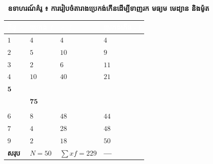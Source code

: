 \documentclass[theme=teal]{khmermath}
\renewcommand{\arraystretch}{1.14}
\begin{document}
\begin{khcard}
  {\fontsize{9.5}{9.5}\selectfont\kml\bfseries\color{brandNavy}\ ឧទាហរណ៍គំរូ ៖ ការរៀបចំតារាងប្រេកង់កើនដើម្បីទាញរក មធ្យម មេដ្យាន និងម៉ូត}\\[3.5pt]
  \noindent
  \begin{minipage}[t]{0.435\textwidth}
    \centering
    \renewcommand{\arraystretch}{1.72}
    {\fontsize{8.5}{8.5}\selectfont
    \begin{tabular}{|>{\centering\arraybackslash}m{1.1cm}|>{\centering\arraybackslash}m{1.42cm}|>{\centering\arraybackslash}m{1.45cm}|>{\centering\arraybackslash}m{1.85cm}|}
      \hline
      \rowcolor{tableHeaderBg}
      \textcolor{white}{\textbf{ពិន្ទុ $x$}} & \textcolor{white}{\textbf{ប្រេកង់ $f$}} & \textcolor{white}{\textbf{$x \cdot f$}} & \textcolor{white}{\textbf{ប្រេកង់កើន $cf$}} \\
      \hline
      \rowcolor{white}
      $1$ & $4$ & $4$ & $4$ \\
      \hline
      \rowcolor{tableRowAlt}
      $2$ & $5$ & $10$ & $9$ \\
      \hline
      \rowcolor{white}
      $3$ & $2$ & $6$ & $11$ \\
      \hline
      \rowcolor{tableRowAlt}
      $4$ & $10$ & $40$ & $21$ \\
      \hline
      \rowcolor{koreaYellow!60}
      $\mathbf{5}$ & \shortstack{$\mathbf{15}$\\[-1pt]{\fontsize{5.5}{5.5}\selectfont\color{brandCrimson}\textbf{(ធំជាងគេ)}}} & $\mathbf{75}$ & \shortstack{$\mathbf{36}$\\[-1pt]{\fontsize{5.5}{5.5}\selectfont\color{kmBlueMain}\textbf{(ក្ដោប $25.5$)}}} \\
      \hline
      \rowcolor{white}
      $6$ & $8$ & $48$ & $44$ \\
      \hline
      \rowcolor{tableRowAlt}
      $7$ & $4$ & $28$ & $48$ \\
      \hline
      \rowcolor{white}
      $9$ & $2$ & $18$ & $50$ \\
      \hline
      \rowcolor{brandNavy!15}
      \textbf{សរុប} & \textbf{$N = 50$} & \textbf{$\sum xf = 229$} & \textbf{---} \\
      \hline
    \end{tabular}
    }
  \end{minipage}\hfill

\end{khcard}
\end{document}
